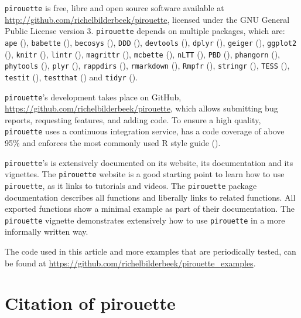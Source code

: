 \verb;pirouette; is free, libre and open source software available at 
\url{http://github.com/richelbilderbeek/pirouette},
licensed under the GNU General Public License version 3.
\verb;pirouette; depends on multiple packages, which are:
\verb;ape; (\cite{ape}),
\verb;babette; (\cite{bilderbeek2018babette}),
\verb;becosys; (\cite{becosys}),
\verb;DDD; (\cite{DDD}),
\verb;devtools; (\cite{devtools}),
\verb;dplyr; (\cite{dplyr}),
\verb;geiger; (\cite{geiger}),
\verb;ggplot2; (\cite{ggplot2}),
\verb;knitr; (\cite{knitr}),
\verb;lintr; (\cite{lintr}),
\verb;magrittr; (\cite{magrittr}),
\verb;mcbette; (\cite{mcbette}),
\verb;nLTT; (\cite{nLTT}),
\verb;PBD; (\cite{PBD}),
\verb;phangorn; (\cite{phangorn}),
\verb;phytools; (\cite{phytools}),
\verb;plyr; (\cite{plyr}),
\verb;rappdirs; (\cite{rappdirs}),
\verb;rmarkdown; (\cite{rmarkdown}),
\verb;Rmpfr; (\cite{Rmpfr}),
\verb;stringr; (\cite{stringr}),
\verb;TESS; (\cite{TESS}),
\verb;testit; (\cite{testit}), 
\verb;testthat; (\cite{testthat}) and
\verb;tidyr; (\cite{tidyr}).

\verb;pirouette;'s development takes place on GitHub,
\url{https://github.com/richelbilderbeek/pirouette},
which allows submitting bug reports, requesting features, 
and adding code. To ensure a high quality, \verb;pirouette; 
uses a continuous integration service, has a code coverage of above 95\%
and enforces the most commonly used R style guide (\cite{style_guide}).

\verb;pirouette;'s is extensively documented on its website,
its documentation and its vignettes.
The \verb;pirouette; website is a good starting point to learn
how to use \verb;pirouette;, as it links to tutorials and videos.
The \verb;pirouette; package documentation describes
all functions and liberally links to related functions.
All exported functions show a minimal example as part of their documentation.
The \verb;pirouette; vignette demonstrates extensively how 
to use \verb;pirouette; in a more informally written way. 

The code used in this article and more examples that are periodically 
tested, can be found at 
\url{https://github.com/richelbilderbeek/pirouette_examples}. 

\section{Citation of pirouette}

